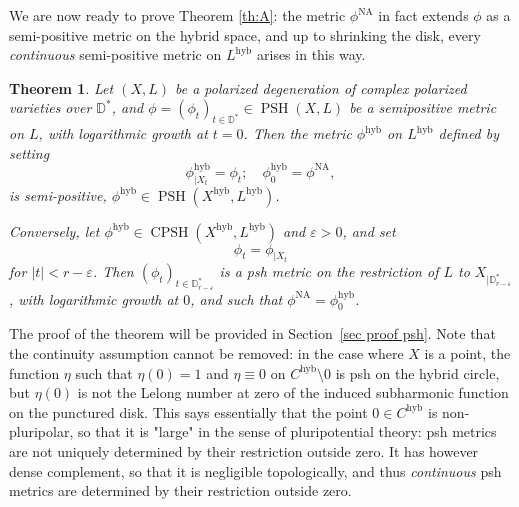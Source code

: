 \documentclass[JEP,XML,SOM,Unicode,published]{cedram}
\newtheorem{theo}[equation]{Theorem}
\theoremstyle{definition}
\newcommand \D {\mathbb{D}}
\let\eps\varepsilon
\DeclareMathOperator{\CPSH}{CPSH}
\newcommand{\hyb}{\mathrm{hyb}}
\DeclareMathOperator{\NA}{NA}
\DeclareMathOperator{\PSH}{PSH}
\begin{document}
We are now ready to prove Theorem \ref{th:A}: the metric $\phi^{\NA}$ in fact extends $\phi$ as a semi-positive metric on the hybrid space, and up to shrinking the disk, every \emph{continuous} semi-positive metric on $L^{\hyb}$ arises in this way.
\begin{theo}\label{theo psh hyb}
Let $(X,L)$ be a polarized degeneration of complex polarized varieties over $\D^*$, and $\phi = (\phi_t)_{t \in \D^*} \in \PSH(X,L)$ be a semipositive metric on $L$, with logarithmic growth at $t=0$. Then the metric $\phi^{\hyb}$ on $L^{\hyb}$ defined by setting
\[
\phi^{\hyb}_{|X_t} = \phi_t;\quad\phi^{\hyb}_0 = \phi^{\NA},
\]
is semi-positive, \ie $\phi^{\hyb} \in \PSH(X^{\hyb}, L^{\hyb})$.

Conversely, let $\phi^{\hyb} \in \CPSH(X^{\hyb}, L^{\hyb})$ and $\eps>0$, and set
\[
\phi_t = \phi_{| X_t}
\]
for $\lvert t \rvert < r- \eps$.
Then $(\phi_t)_{t \in \D_{r-\eps}^*}$ is a psh metric on the restriction of $L$ to $X_{| \D^*_{r- \eps}}$, with logarithmic growth at $0$, and such that $\phi^{\NA} = \phi^{\hyb}_0$.
\end{theo}
The proof of the theorem will be provided in Section~\ref{sec proof psh}.
Note that the continuity assumption cannot be removed: in the case where $X$ is a point, the function $\eta$ such that $\eta(0)=1$ and $\eta \equiv 0$ on $C^{\hyb} \setminus 0$ is psh on the hybrid circle, but $\eta(0)$ is not the Lelong number at zero of the induced subharmonic function on the punctured disk. This says essentially that the point $0 \in C^{\hyb}$ is non-pluripolar, so that it is "large" in the sense of pluripotential theory: psh metrics are not uniquely determined by their restriction outside zero. It has however dense complement, so that it is negligible topologically, and thus \emph{continuous} psh metrics are determined by their restriction outside zero.
\end{document}
